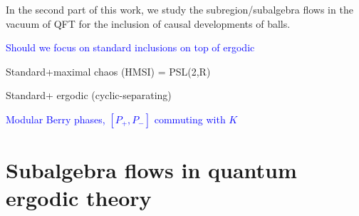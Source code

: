 \documentclass[a4paper,11pt]{article}
\theoremstyle{definition}
\theoremstyle{remark}
\newcommand{\mA}{\mathcal{A}}
\newcommand{\mB}{\mathcal{B}}
\newcommand{\mH}{\mathcal{H}}
\newcommand{\NL}[1]{\textcolor{blue}{#1}}
\newcommand{\mE}{\mathcal{E}}
\begin{document}
In the second part of this work, we study the subregion/subalgebra flows in the vacuum of QFT for the inclusion of causal developments of balls.




\NL{Should we focus on standard inclusions on top of ergodic}

Standard+maximal chaos (HMSI)  = PSL(2,R)

Standard+ ergodic (cyclic-separating)

\NL{Modular Berry phases, $[P_+,P_-]$ commuting with $K$}


\section{Subalgebra flows in quantum ergodic theory}%
\label{section:basics}
\label{subsec:quantum-coarse}
 
 
\end{document}
